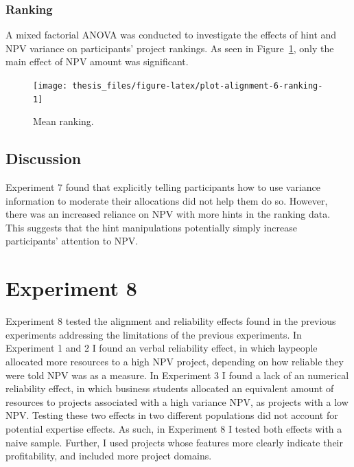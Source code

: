 \documentclass[a4paper, nobind, dvipsnames]{templates/ociamthesis}
\theoremstyle{definition}
\theoremstyle{definition}
\theoremstyle{definition}
\theoremstyle{definition}
\theoremstyle{remark}
\begin{document}
\hypertarget{ranking-3}{%
\subsubsection{Ranking}\label{ranking-3}}

A mixed factorial ANOVA was conducted to investigate the effects of hint
and NPV variance on participants' project rankings. As seen in
Figure~\ref{fig:plot-alignment-6-ranking}, only the main effect of NPV amount
was significant.



\begin{figure}
\texttt{[image: thesis\_files/figure-latex/plot-alignment-6-ranking-1]} \caption{Mean ranking.}\label{fig:plot-alignment-6-ranking}
\end{figure}

\hypertarget{discussion-14}{%
\subsection{Discussion}\label{discussion-14}}

Experiment 7 found that explicitly telling participants how to use variance
information to moderate their allocations did not help them do so. However,
there was an increased reliance on NPV with more hints in the ranking data. This
suggests that the hint manipulations potentially simply increase participants'
attention to NPV.

\hypertarget{alignment-7}{%
\section{Experiment 8}\label{alignment-7}}

Experiment 8 tested the alignment and reliability effects found in the previous
experiments addressing the limitations of the previous experiments. In
Experiment 1 and 2 I found an verbal reliability effect, in which laypeople
allocated more resources to a high NPV project, depending on how reliable they
were told NPV was as a measure. In Experiment 3 I found a lack of an numerical
reliability effect, in which business students allocated an equivalent amount of
resources to projects associated with a high variance NPV, as projects with a
low NPV. Testing these two effects in two different populations did not account
for potential expertise effects. As such, in Experiment 8 I tested both effects
with a naive sample. Further, I used projects whose features more clearly
indicate their profitability, and included more project domains.
\end{document}
